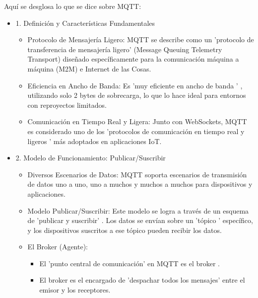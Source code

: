 \documentclass{report}
\begin{document}
Aquí se desglosa lo que se  dice sobre MQTT:
\begin{itemize}
    \item 1. Definición y Características Fundamentales
    \begin{itemize}
        \item Protocolo de Mensajería Ligero: MQTT se describe como un   'protocolo de transferencia de mensajería ligero'  
        (Message Queuing Telemetry Transport) diseñado específicamente para la comunicación máquina a máquina (M2M) e Internet de las Cosas.
        \item Eficiencia en Ancho de Banda: Es   'muy eficiente en ancho de banda ' , utilizando solo 2 bytes de sobrecarga, lo que lo hace 
        ideal para entornos con reproyectos limitados.
        \item Comunicación en Tiempo Real y Ligera: Junto con WebSockets, MQTT es considerado uno de los 'protocolos de comunicación en tiempo real 
        y ligeros '  más adoptados en aplicaciones IoT.
    \end{itemize}

    \item 2. Modelo de Funcionamiento: Publicar/Suscribir
    \begin{itemize}
        \item Diversos Escenarios de Datos: MQTT soporta escenarios de transmisión de datos  uno a uno, uno a muchos y muchos a muchos  para 
        dispositivos y aplicaciones.
        \item Modelo Publicar/Suscribir: Este modelo se logra a través de un esquema de   'publicar y suscribir' . Los datos se envían sobre un  
        'tópico ' específico, y los dispositivos suscritos a ese tópico pueden recibir los datos.
        \item El Broker (Agente):
        \begin{itemize}
            \item El 'punto central de comunicación' en MQTT es el  broker .
            \item El broker es el encargado de 'despachar todos los mensajes'  entre el emisor y los receptores.
        \end{itemize}
        

\end{itemize}
\end{itemize}
\end{document}
